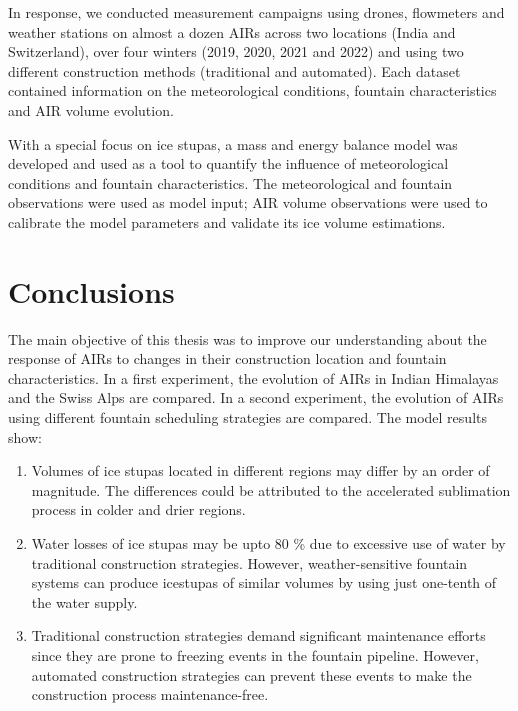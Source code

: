 In response, we conducted measurement campaigns using drones, flowmeters and weather stations on almost a dozen
AIRs across two locations (India and Switzerland), over four winters (2019, 2020, 2021 and 2022) and using two
different construction methods (traditional and automated). Each dataset contained information on the
meteorological conditions, fountain characteristics and AIR volume evolution. 

With a special focus on ice stupas, a mass and energy balance model was developed and used as a tool to quantify
the influence of meteorological conditions and fountain characteristics. The meteorological and fountain
observations were used as model input; AIR volume observations were used to calibrate the model parameters and
validate its ice volume estimations.

\section{Conclusions}

The main objective of this thesis was to improve our understanding about the response of AIRs to changes in
their construction location and fountain characteristics. In a first experiment, the evolution of AIRs in Indian
Himalayas and the Swiss Alps are compared. In a second experiment, the evolution of AIRs using different
fountain scheduling strategies are compared. The model results show: 

\begin{enumerate} 

\item Volumes of ice stupas located in different regions may differ by an order of magnitude. The differences
  could be attributed to the accelerated sublimation process in colder and drier regions.

\item Water losses of ice stupas may be upto 80 \% due to excessive use of water by traditional construction
  strategies. However, weather-sensitive fountain systems can produce icestupas of similar volumes by using just
  one-tenth of the water supply.

\item Traditional construction strategies demand significant maintenance efforts since they are prone to
  freezing events in the fountain pipeline. However, automated construction strategies can prevent these events
  to make the construction process maintenance-free.

\end{enumerate}

